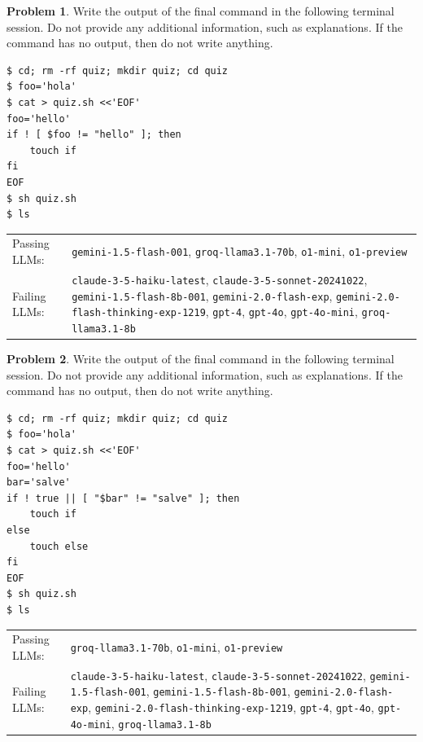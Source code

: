 \documentclass[10pt]{article}
\theoremstyle{definition}
\newtheorem{problem}{Problem}
\begin{document}
\noindent\vspace{0.1in}\begin{minipage}{\textwidth}

\begin{problem}
Write the output of the final command in the following terminal session.
Do not provide any additional information,
such as explanations.
If the command has no output,
then do not write anything.

\end{problem}
\begin{lstlisting}
$ cd; rm -rf quiz; mkdir quiz; cd quiz
$ foo='hola'
$ cat > quiz.sh <<'EOF'
foo='hello'
if ! [ $foo != "hello" ]; then
    touch if
fi
EOF
$ sh quiz.sh
$ ls
\end{lstlisting}


\noindent
\begin{tabular}{p{1.0in}L{5in}}
Passing LLMs: & {\lstinline$gemini-1.5-flash-001$}, {\lstinline$groq-llama3.1-70b$}, {\lstinline$o1-mini$}, {\lstinline$o1-preview$} \\
Failing LLMs: & {\lstinline$claude-3-5-haiku-latest$}, {\lstinline$claude-3-5-sonnet-20241022$}, {\lstinline$gemini-1.5-flash-8b-001$}, {\lstinline$gemini-2.0-flash-exp$}, {\lstinline$gemini-2.0-flash-thinking-exp-1219$}, {\lstinline$gpt-4$}, {\lstinline$gpt-4o$}, {\lstinline$gpt-4o-mini$}, {\lstinline$groq-llama3.1-8b$} \\
\end{tabular}

\end{minipage}
\noindent\vspace{0.1in}\begin{minipage}{\textwidth}

\begin{problem}
Write the output of the final command in the following terminal session.
Do not provide any additional information,
such as explanations.
If the command has no output,
then do not write anything.

\end{problem}
\begin{lstlisting}
$ cd; rm -rf quiz; mkdir quiz; cd quiz
$ foo='hola'
$ cat > quiz.sh <<'EOF'
foo='hello'
bar='salve'
if ! true || [ "$bar" != "salve" ]; then
    touch if
else
    touch else
fi
EOF
$ sh quiz.sh
$ ls
\end{lstlisting}


\noindent
\begin{tabular}{p{1.0in}L{5in}}
Passing LLMs: & {\lstinline$groq-llama3.1-70b$}, {\lstinline$o1-mini$}, {\lstinline$o1-preview$} \\
Failing LLMs: & {\lstinline$claude-3-5-haiku-latest$}, {\lstinline$claude-3-5-sonnet-20241022$}, {\lstinline$gemini-1.5-flash-001$}, {\lstinline$gemini-1.5-flash-8b-001$}, {\lstinline$gemini-2.0-flash-exp$}, {\lstinline$gemini-2.0-flash-thinking-exp-1219$}, {\lstinline$gpt-4$}, {\lstinline$gpt-4o$}, {\lstinline$gpt-4o-mini$}, {\lstinline$groq-llama3.1-8b$} \\
\end{tabular}

\end{minipage}
\end{document}
